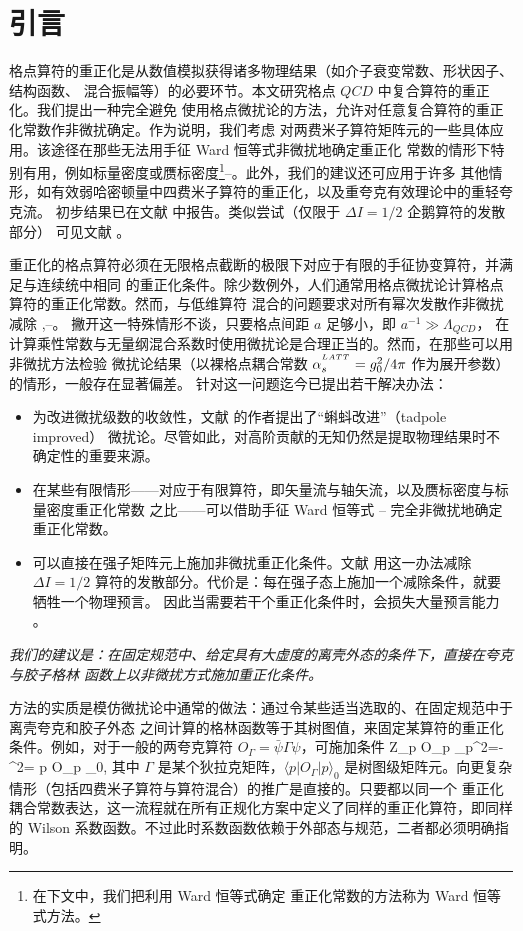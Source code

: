 \section{引言}
\label{sec:intro}

格点算符的重正化是从数值模拟获得诸多物理结果（如介子衰变常数、形状因子、结构函数、
混合振幅等）的必要环节。本文研究格点 $QCD$ 中复合算符的重正化。我们提出一种完全避免
使用格点微扰论的方法，允许对任意复合算符的重正化常数作非微扰确定。作为说明，我们考虑
对两费米子算符矩阵元的一些具体应用。该途径在那些无法用手征 Ward 恒等式非微扰地确定重正化
常数的情形下特别有用，例如标量密度或赝标密度\footnote{在下文中，我们把利用 Ward 恒等式确定
重正化常数的方法称为 Ward 恒等式方法。}\cite{bo}--\cite{wi}。此外，我们的建议还可应用于许多
其他情形，如有效弱哈密顿量中四费米子算符的重正化，以及重夸克有效理论中的重轻夸克流。
初步结果已在文献 \cite{dallas} 中报告。类似尝试（仅限于 $\Delta I=1/2$ 企鹅算符的发散部分）
可见文献 \cite{ber1}。

重正化的格点算符必须在无限格点截断的极限下对应于有限的手征协变算符，并满足与连续统中相同
的重正化条件。除少数例外，人们通常用格点微扰论计算格点算符的重正化常数。然而，与低维算符
混合的问题要求对所有幂次发散作非微扰减除 \cite{bo},\cite{te}--\cite{martsukuba}。
撇开这一特殊情形不谈，只要格点间距 $a$ 足够小，即 $ a^{-1} \gg \Lambda_{QCD}$，
在计算乘性常数与无量纲混合系数时使用微扰论是合理正当的。然而，在那些可以用非微扰方法检验
微扰论结果（以裸格点耦合常数 $\alpha_s^{{}^{LATT}}=g_{0}^{2}/4 \pi$ 作为展开参数）的情形，一般存在显著偏差。
针对这一问题迄今已提出若干解决办法：
\begin{itemize}
\item 为改进微扰级数的收敛性，文献 \cite{lepage} 的作者提出了``蝌蚪改进''（tadpole improved）
微扰论。尽管如此，对高阶贡献的无知仍然是提取物理结果时不确定性的重要来源。
\item 在某些有限情形——对应于有限算符，即矢量流与轴矢流，以及赝标密度与标量密度重正化常数
之比——可以借助手征 Ward 恒等式 \cite{bo}--\cite{wi} 完全非微扰地确定重正化常数。
\item 可以直接在强子矩阵元上施加非微扰重正化条件。文献 \cite{gav1} 用这一办法减除
$\Delta I=1/2$ 算符的发散部分。代价是：每在强子态上施加一个减除条件，就要牺牲一个物理预言。
因此当需要若干个重正化条件时，会损失大量预言能力 \cite{bo,te}。
\end{itemize}

{\itshape 我们的建议是：在固定规范中、给定具有大虚度的离壳外态的条件下，直接在夸克与胶子格林
函数上以非微扰方式施加重正化条件。}

方法的实质是模仿微扰论中通常的做法：通过令某些适当选取的、在固定规范中于离壳夸克和胶子外态
之间计算的格林函数等于其树图值，来固定某算符的重正化条件。例如，对于一般的两夸克算符
$O_\Gamma= \bar \psi \Gamma \psi$，可施加条件
\beq Z_\Gamma \langle p \vert O_\Gamma \vert p \rangle\vert_{p^2=-\mu^2}=
\langle p \vert O_\Gamma \vert p \rangle_0, \eeq
其中 $\Gamma$ 是某个狄拉克矩阵，$\langle p \vert O_\Gamma \vert p \rangle_0$
是树图级矩阵元。向更复杂情形（包括四费米子算符与算符混合）的推广是直接的。只要都以同一个
重正化耦合常数表达，这一流程就在所有正规化方案中定义了同样的重正化算符，即同样的 Wilson
系数函数。不过此时系数函数依赖于外部态与规范，二者都必须明确指明。


